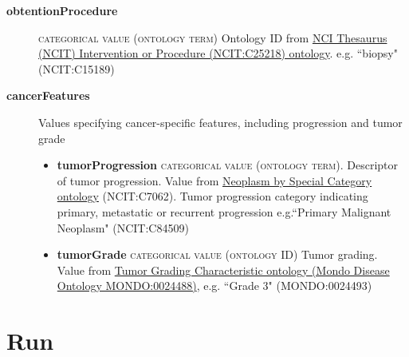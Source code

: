 \documentclass[a4paper, 10pt]{article}        %
\begin{document}
\begin{description}
\begin{itemize}
	\end{itemize}
	\item[\textbf{obtentionProcedure}] {\textsc{categorical value (ontology term)}} Ontology ID from \href{http://purl.obolibrary.org/obo/NCIT_C25218}{NCI Thesaurus (NCIT) Intervention or Procedure (NCIT:C25218) ontology}. e.g. ``biopsy" (NCIT:C15189) %
	\item[\textbf{cancerFeatures}] Values specifying cancer-specific features, including progression and tumor grade
	\begin{itemize}
			\item[] \textbf{tumorProgression} {\textsc{categorical value (ontology term)}}. Descriptor of tumor progression. Value from \href{https://www.ebi.ac.uk/ols/ontologies/ncit/terms?iri=http%3A%2F%2Fpurl.obolibrary.org%2Fobo%2FNCIT_C7062&viewMode=All&siblings=false}{Neoplasm by Special Category ontology} (NCIT:C7062). Tumor progression category indicating primary, metastatic or recurrent progression  e.g.``Primary Malignant Neoplasm" (NCIT:C84509)
			\item[] \textbf{tumorGrade} {\textsc{categorical value (ontology ID)}} Tumor grading. Value from \href{https://www.ebi.ac.uk/ols/ontologies/mondo/terms?iri=http%3A%2F%2Fpurl.obolibrary.org%2Fobo%2FMONDO_0024488}{Tumor Grading Characteristic ontology (Mondo Disease Ontology MONDO:0024488)}, e.g. ``Grade 3" (MONDO:0024493)

\end{itemize} 
 \end{description}
 


   \section*{ {\color{teal} Run}}
  
\end{document}
